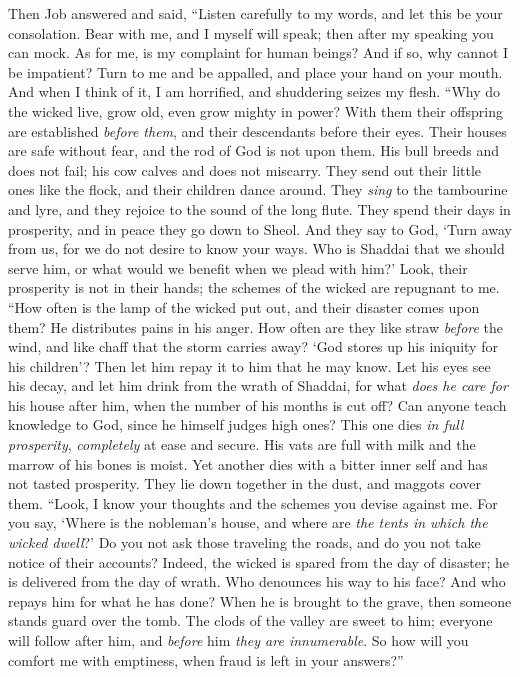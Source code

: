 \begin{biblechapter} %
 Then Job answered and said,
\verse “Listen carefully to my words, 
and let this be your consolation.
\verse Bear with me, and I myself will speak; 
then after my speaking you can mock.
\verse As for me, is my complaint for human beings? 
And if so, why cannot I be impatient?
\verse Turn to me and be appalled, 
and place your hand on your mouth.
\verse And when I think of it, I am horrified, 
and shuddering seizes my flesh.
\verse “Why do the wicked live, 
grow old, even grow mighty in power?
\verse With them their offspring are established \textit{before them}, 
and their descendants before their eyes.
\verse Their houses are safe without fear, 
and the rod of God is not upon them.
\verse His bull breeds and does not fail; 
his cow calves and does not miscarry.
\verse They send out their little ones like the flock, 
and their children dance around.
\verse They \textit{sing} to the tambourine and lyre, 
and they rejoice to the sound of the long flute.
\verse They spend their days in prosperity, 
and in peace they go down to Sheol.
\verse And they say to God, ‘Turn away from us, 
for we do not desire to know your ways.
\verse Who is Shaddai that we should serve him, 
or what would we benefit when we plead with him?’
\verse Look, their prosperity is not in their hands; 
the schemes of the wicked are repugnant to me.
\verse “How often is the lamp of the wicked put out, 
and their disaster comes upon them? 
He distributes pains in his anger.
\verse How often are they like straw \textit{before} the wind, 
and like chaff that the storm carries away?
\verse ‘God stores up his iniquity for his children’? 
Then let him repay it to him that he may know.
\verse Let his eyes see his decay, 
and let him drink from the wrath of Shaddai,
\verse for what \textit{does he care for} his house after him, 
when the number of his months is cut off?
\verse Can anyone teach knowledge to God, 
since he himself judges high ones?
\verse This one dies \textit{in full prosperity}, 
\textit{completely} at ease and secure.
\verse His vats are full with milk 
and the marrow of his bones is moist.
\verse Yet another dies with a bitter inner self 
and has not tasted prosperity.
\verse They lie down together in the dust, 
and maggots cover them.
\verse “Look, I know your thoughts 
and the schemes you devise against me.
\verse For you say, ‘Where is the nobleman’s house, 
and where are \textit{the tents in which the wicked dwell}?’
\verse Do you not ask those traveling the roads, 
and do you not take notice of their accounts?
\verse Indeed, the wicked is spared from the day of disaster; 
he is delivered from the day of wrath.
\verse Who denounces his way to his face? 
And who repays him for what he has done?
\verse When he is brought to the grave, 
then someone stands guard over the tomb.
\verse The clods of the valley are sweet to him; 
everyone will follow after him, 
and \textit{before} him \textit{they are innumerable}.
\verse So how will you comfort me with emptiness, 
when fraud is left in your answers?”
\end{biblechapter}

